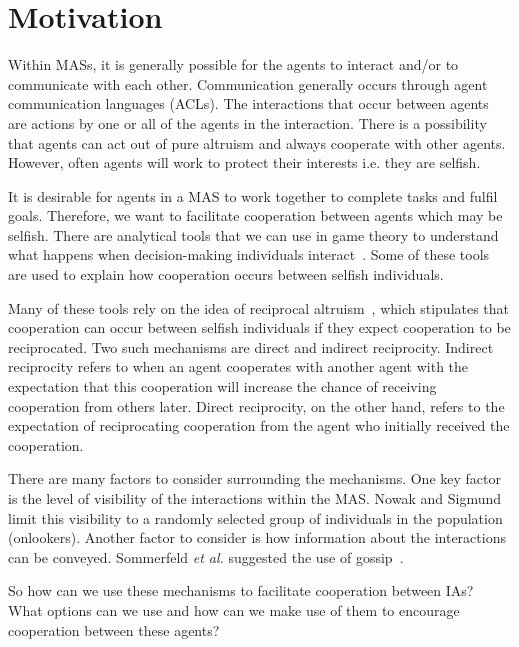 \documentclass[]{final_report}
\begin{document}
\section{Motivation}
Within MASs, it is generally possible for the agents to interact and/or to communicate with each other. Communication generally occurs through agent communication languages (ACLs). The interactions that occur between agents are actions by one or all of the agents in the interaction. There is a possibility that agents can act out of pure altruism and always cooperate with other agents. However, often agents will work to protect their interests i.e. they are selfish.\par
It is desirable for agents in a MAS to work together to complete tasks and fulfil goals. Therefore, we want to facilitate cooperation between agents which may be selfish. There are analytical tools that we can use in game theory to understand what happens when decision-making individuals interact~\cite{myerson2013game}. Some of these tools are used to explain how cooperation occurs between selfish individuals.\par
Many of these tools rely on the idea of reciprocal altruism~\cite{trivers1971evolution}, which stipulates that cooperation can occur between selfish individuals if they expect cooperation to be reciprocated. Two such mechanisms are direct and indirect reciprocity. Indirect reciprocity refers to when an agent cooperates with another agent with the expectation that this cooperation will increase the chance of receiving cooperation from others later. Direct reciprocity, on the other hand, refers to the expectation of reciprocating cooperation from the agent who initially received the cooperation.\par
There are many factors to consider surrounding the mechanisms. One key factor is the level of visibility of the interactions within the MAS. Nowak and Sigmund~\cite{evol_indirect_image} limit this visibility to a randomly selected group of individuals in the population (onlookers). Another factor to consider is how information about the interactions can be conveyed. Sommerfeld \textit{et al.} suggested the use of gossip~\cite{gossip_alt}.\par 
So how can we use these mechanisms to facilitate cooperation between IAs? What options can we use and how can we make use of them to encourage cooperation between these agents?
\end{document}
